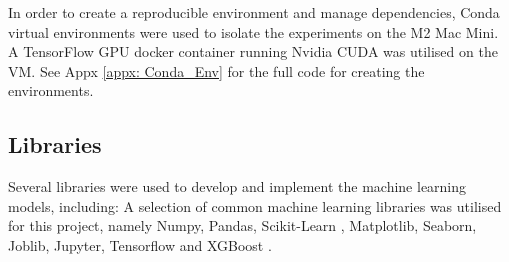 \medskip
In order to create a reproducible environment and manage dependencies, Conda virtual environments \parencite{anaconda} were used to isolate the experiments on the M2 Mac Mini. A TensorFlow GPU docker container running Nvidia CUDA was utilised on the VM. See Appx \ref{appx: Conda_Env} for the full code for creating the environments.

\subsection{Libraries}

Several libraries were used to develop and implement the machine learning models, including: 
A selection of common machine learning libraries was utilised for this project, namely Numpy, Pandas, Scikit-Learn \parencite{scikit-learn}, Matplotlib, Seaborn, Joblib, Jupyter, Tensorflow \parencite{tensorflow2015-whitepaper} and XGBoost \parencite{XGBoost}. 




